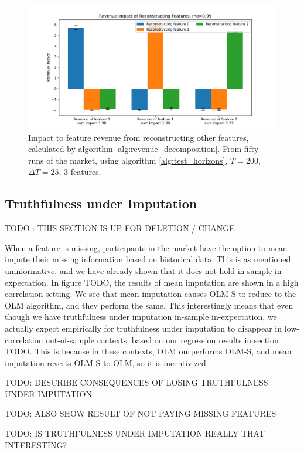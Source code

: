 \begin{figure}
  \centering
  \includegraphics[width=.9\linewidth]{Pictures/reconstruction_impact.pdf}
  \caption{Impact to feature revenue from reconstructing other features,
    calculated by algorithm \ref{alg:revenue_decomposition}. From fifty runs of
    the market, using algorithm \ref{alg:test_horizons}, $T=200$, $\Delta T=25$,
    3 features.}
  \label{fig:revenue_impact}
\end{figure}




\subsection{Truthfulness under Imputation}
TODO : THIS SECTION IS UP FOR DELETION / CHANGE

When a feature is missing, participants in the market have the option to mean
impute their missing information based on historical data. This is as mentioned
uninformative, and we have already shown that it does not hold in-sample
in-expectation. In figure TODO, the results of mean imputation are shown in a
high correlation setting. We see that mean imputation causes OLM-S to reduce to
the OLM algorithm, and they perform the same. This interestingly means that
even though we have truthfulness under imputation in-sample in-expectation, we
actually expect empirically for truthfulness under imputation to disappear in
low-correlation out-of-sample contexts, based on our regression results in
section TODO. This is because in these contexts, OLM ourperforms OLM-S, and
mean imputation reverts OLM-S to OLM, so it is incentivized.

TODO: DESCRIBE CONSEQUENCES OF LOSING TRUTHFULNESS UNDER IMPUTATION

TODO: ALSO SHOW RESULT OF NOT PAYING MISSING FEATURES

TODO: IS TRUTHFULNESS UNDER IMPUTATION REALLY THAT INTERESTING?

